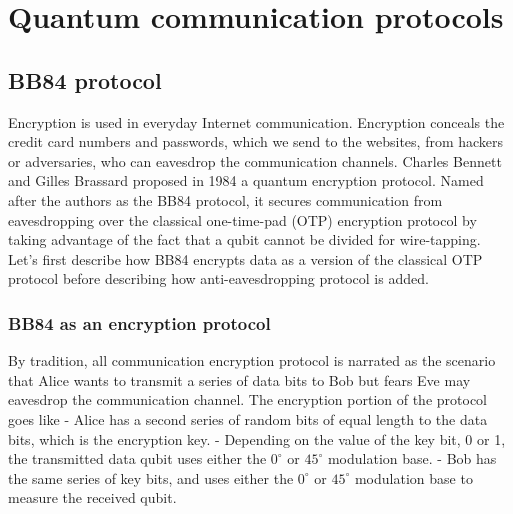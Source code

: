 \documentclass[Letter,11pt]{book}
\begin{document}
\chapter{Quantum communication protocols}

\section{BB84 protocol}
Encryption is used in everyday Internet communication. Encryption conceals the credit card numbers and passwords, which we send to the websites, from hackers or adversaries, who can eavesdrop the communication channels. Charles Bennett and Gilles Brassard proposed in 1984 a quantum encryption protocol\cite{BB84}. Named after the authors as the BB84 protocol, it secures communication from eavesdropping over the classical one-time-pad (OTP) encryption protocol\cite{Schneier} by taking advantage of the fact that a qubit cannot be divided for wire-tapping. Let's first describe how BB84 encrypts data as a version of the classical OTP protocol before describing how anti-eavesdropping protocol is added.

\subsection{BB84 as an encryption protocol}
By tradition, all communication encryption protocol is narrated as the scenario that Alice wants to transmit a series of data bits to Bob but fears Eve may eavesdrop the communication channel\cite{Schneier}. The encryption portion of the protocol goes like
- Alice has a second series of random bits of equal length to the data bits, which is the encryption key.
- Depending on the value of the key bit, 0 or 1, the transmitted data qubit uses either the $0^\circ$ or $45^\circ$ modulation base.
- Bob has the same series of key bits, and uses either the $0^\circ$ or $45^\circ$ modulation base to measure the received qubit.

\end{document}

